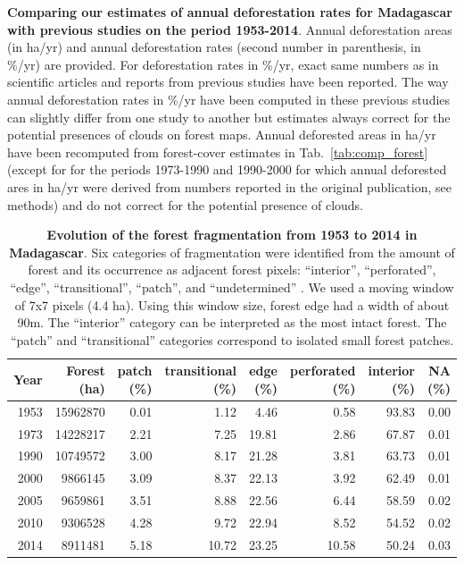 \documentclass[a4paper, 12pt, leqno]{article} %
\begin{document}
\begin{table}[!h]
  \caption{\textbf{Comparing our estimates of annual deforestation
      rates for Madagascar with previous studies on the period
      1953-2014}. Annual deforestation areas (in ha/yr) and annual
    deforestation rates (second number in parenthesis, in \%/yr) are
    provided. For deforestation rates in \%/yr, exact same numbers as
    in scientific articles and reports from previous studies have been
    reported. The way annual deforestation rates in \%/yr have been
    computed in these previous studies can slightly differ from one
    study to another but estimates always correct for the potential
    presences of clouds on forest maps. Annual deforested areas in
    ha/yr have been recomputed from forest-cover estimates in
    Tab.~\ref{tab:comp_forest} (except for \citet{Harper2007} for the
    periods 1973-1990 and 1990-2000 for which annual deforested ares
    in ha/yr were derived from numbers reported in the original
    publication, see methods) and do not correct for the potential
    presence of clouds.}

  \label{tab:comp_defor}
\end{table}

\newpage

\begin{table}[!h]

  {\small
  \begin{longtable}[]{@{}rrrrrrrr@{}}
    \toprule
    Year & Forest (ha) & patch (\%) & transitional (\%) & edge (\%) &
    perforated (\%) & interior (\%) & NA (\%)\tabularnewline
    \midrule
    \endhead
    1953 & 15962870 & 0.01 & 1.12 & 4.46 & 0.58 & 93.83 &
    0.00\tabularnewline
    1973 & 14228217 & 2.21 & 7.25 & 19.81 & 2.86 & 67.87 &
    0.01\tabularnewline
    1990 & 10749572 & 3.00 & 8.17 & 21.28 & 3.81 & 63.73 &
    0.01\tabularnewline
    2000 & 9866145 & 3.09 & 8.37 & 22.13 & 3.92 & 62.49 &
    0.01\tabularnewline
    2005 & 9659861 & 3.51 & 8.88 & 22.56 & 6.44 & 58.59 &
    0.02\tabularnewline
    2010 & 9306528 & 4.28 & 9.72 & 22.94 & 8.52 & 54.52 &
    0.02\tabularnewline
    2014 & 8911481 & 5.18 & 10.72 & 23.25 & 10.58 & 50.24 &
    0.03\tabularnewline
    \bottomrule
  \end{longtable}}
  \addtocounter{table}{-1}

  \caption{\textbf{Evolution of the forest fragmentation from 1953 to 2014
      in Madagascar}. Six categories of fragmentation were identified from the
    amount of forest and its occurrence as adjacent forest pixels:
    ``interior'', ``perforated'', ``edge'', ``transitional'', ``patch'', and
    ``undetermined'' \citep{Riitters2000}. We used a moving window of 7x7
    pixels (4.4 ha). Using this window size, forest edge had a width of
    about 90m. The ``interior'' category can be interpreted as the most
    intact forest. The ``patch'' and ``transitional'' categories correspond
    to isolated small forest patches.}

  \label{tab:frag}
\end{table}
\end{document}
